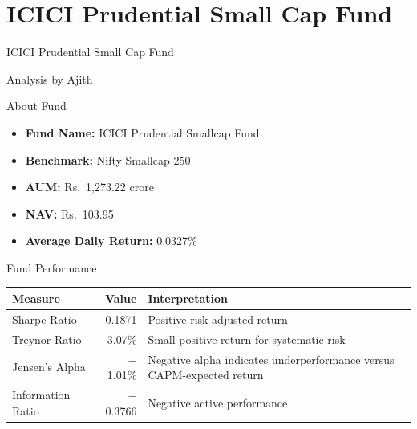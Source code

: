 \documentclass[11pt, aspectratio=43]{beamer}
\begin{document}
\section{ICICI Prudential Small Cap Fund} %

\begin{frame}{}
\centering
\vspace{2em}
{\huge ICICI Prudential Small Cap Fund}

\vspace{1.5em}
{\large Analysis by Ajith}

\end{frame}

\begin{frame}{About Fund}
\begin{itemize}
    \item \textbf{Fund Name:} ICICI Prudential Smallcap Fund
    \item \textbf{Benchmark:} Nifty Smallcap 250
    \item \textbf{AUM:} Rs.\ 1,273.22 crore
    \item \textbf{NAV:} Rs.\ 103.95
    \item \textbf{Average Daily Return:} 0.0327\%
\end{itemize}
\end{frame}

\begin{frame}{Fund Performance}
\centering
\small
\begin{tabular}{l r p{4.8cm}}
\toprule
\textbf{Measure} & \textbf{Value} & \textbf{Interpretation} \\
\midrule
Sharpe Ratio & 0.1871 & Positive risk-adjusted return \\
Treynor Ratio & 3.07\% & Small positive return for systematic risk \\
Jensen's Alpha & $-$1.01\% & Negative alpha indicates underperformance versus CAPM-expected return \\
Information Ratio & $-$0.3766 & Negative active performance \\
\bottomrule
\end{tabular}

\end{frame}
\end{document}

